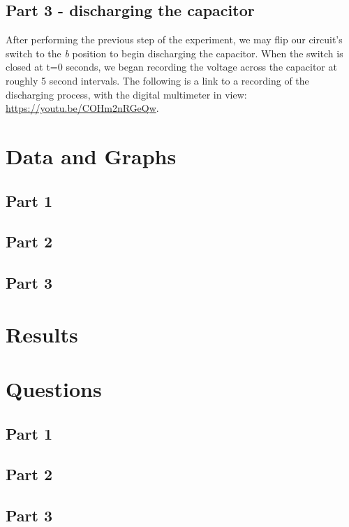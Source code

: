 \documentclass[titlepage]{article}
\begin{document}
    \subsection{Part 3 - discharging the capacitor}
    After performing the previous step of the experiment, we may flip our circuit's switch to the \emph{b} position to begin discharging the capacitor. When the switch is closed at t=0 seconds, we began recording the voltage across the capacitor at roughly 5 second intervals. 
    The following is a link to a recording of the discharging process, with the digital multimeter in view: \url{https://youtu.be/COHm2nRGeQw}.




	\section{Data and Graphs}
	\subsection{Part 1}
	\subsection{Part 2} 
	\subsection{Part 3}
	\section{Results}
	\section{Questions}


	\subsection{Part 1}

	\subsection{Part 2}

    \subsection{Part 3}
	
\end{document}
